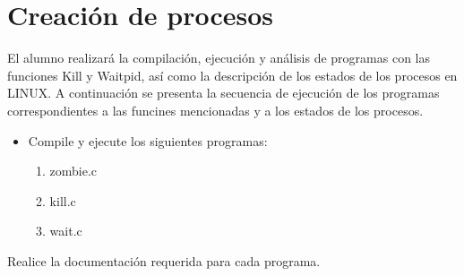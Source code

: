 \section{Creación de procesos}

	El alumno realizará la compilación, ejecución y análisis de programas con las funciones Kill y Waitpid, así como la descripción de los estados de los procesos en LINUX. A continuación se presenta la secuencia de ejecución de los programas correspondientes a las funcines mencionadas y a los estados de los procesos.

\begin{itemize}

	\item Compile y ejecute los siguientes programas:

		\begin{enumerate}

			\item zombie.c
			\item kill.c
			\item wait.c

		\end{enumerate}

\end{itemize}

	Realice la documentación requerida para cada programa.
